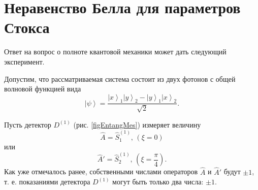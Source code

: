 \section{Неравенство Белла для параметров Стокса}
\label{pPart3EntangleBell}
Ответ на вопрос о полноте квантовой механики может дать следующий
эксперимент.

Допустим, что рассматриваемая система состоит из двух фотонов с общей
волновой функцией вида
\begin{equation}
\left|\psi\right> = \frac{
\left|x\right>_1\left|y\right>_2 -
\left|y\right>_1\left|x\right>_2
}{\sqrt{2}}.
\label{eqBellInequalityState}
\end{equation}

Пусть детектор $D^{(1)}$ (рис. \ref{figEntangMes}) измеряет величину 
\[
\hat{A} = \hat{S}_1^{(1)}, \, (\xi = 0)
\] 
или
\[
\hat{A}' = \hat{S}_2^{(1)},\,(\xi =\frac{\pi}{4}).
\]
Как уже отмечалось ранее, собственными числами операторов $\hat{A}$ и
$\hat{A}'$ будут $\pm 1$, т. е. показаниями детектора $D^{(1)}$ могут
быть только два числа: $\pm 1$.

